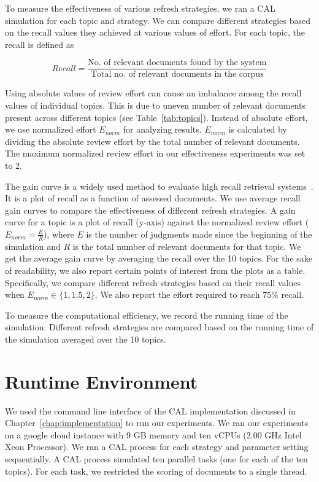 To measure the effectiveness of various refresh strategies, we ran a CAL simulation for
each topic and strategy. We can compare different strategies based on the recall
values they achieved at various values of effort. For each topic, the recall is
defined as

\begin{equation}
    Recall = \frac{\text{No. of relevant documents found by the system}}{\text{Total no. of
    relevant documents in the corpus}}
\end{equation}

Using absolute values of review effort can cause an imbalance among the recall
values of individual topics. This is due to uneven number of relevant documents
present across different topics (see Table~\ref{tab:topics}). Instead of
absolute effort, we use normalized effort $E_{norm}$ for analyzing results.
$E_{norm}$ is calculated by dividing the absolute review effort by the total
number of relevant documents. The maximum normalized review effort in our
effectiveness experiments was set to $2$.

The gain curve is a widely used method to evaluate high recall retrieval
systems~\cite{roegiest2015trec,grossman2016trec,grossman2011overview}. It is a
plot of recall as a function of assessed documents. We use average recall gain
curves to compare the effectiveness of different refresh strategies.  A gain
curve for a topic is a plot of recall (y-axis) against the normalized review
effort ($E_{norm} = \frac{E}{R}$), where $E$ is the number of judgments made
since the beginning of the simulation and $R$ is the total number of relevant
documents for that topic. We get the average gain curve by averaging the recall
over the 10 topics. For the sake of readability, we also report certain points
of interest from the plots as a table. Specifically, we compare different
refresh strategies based on their recall values when $E_{norm} \in \{1,1.5,2\}$.
We also report the effort required to reach $75\%$ recall.

To measure the computational efficiency, we record the running time of the
simulation. Different refresh strategies are compared based on the running time
of the simulation averaged over the 10 topics.


\section{Runtime Environment}

We used the command line interface of the CAL implementation discussed in
Chapter~\ref{chap:implementation} to run our experiments. We ran our experiments
on a google cloud instance with 9 GB memory and ten vCPUs (2.00 GHz Intel Xeon
Processor). We ran a CAL process for each strategy and parameter setting
sequentially. A CAL process simulated ten parallel tasks (one for each of the
ten topics). For each task, we restricted the scoring of documents to a single
thread.


